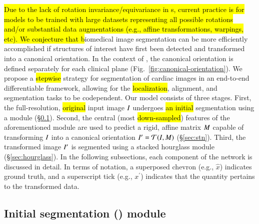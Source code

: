 
\hl{
Due to the lack of rotation invariance/equivariance in \CNN{}s, current practice is for models to be trained with large datasets representing all possible rotations and/or substantial data augmentations (e.g., affine transformations, warpings, etc).
We conjecture that b}iomedical image segmentation can be more efficiently accomplished if structures of interest have first been detected and transformed into a canonical orientation.
In the context of \CMR{}, the canonical orientation is defined separately for each clinical plane (Fig.~\ref{fig:canonical-orientation}).
We propose a \hl{stepwise} strategy for segmentation of cardiac \SSFP{} images in an end-to-end differentiable \CNN{} framework, allowing for the \hl{localization}, alignment, and segmentation tasks to be codependent. 
Our model consists of three stages.
First, the full-resolution, \hl{original} input image $I$ undergoes \hl{an initial} segmentation using a \UNet{} module (\S\ref{sec:unet}).
Second, the central (most \hl{down-sampled}) features of the aforementioned \UNet{} module are used to predict a rigid, affine matrix $M$ capable of transforming $I$ into a canonical orientation $I^\prime = \mathcal{T}(I, M)$ (\S\ref{sec:stn}).
Third, the transformed image $I^\prime$ is segmented using a stacked hourglass module (\S\ref{sec:hourglass}).
In the following subsections, each component of the network is discussed in detail.
In terms of notation, a superposed chevron (e.g., $\hat{x}$) indicates ground truth, and a superscript tick (e.g., $x^\prime$) indicates that the quantity pertains to the transformed data.

\subsection{Initial segmentation (\UNet{}) module}\label{sec:unet}



